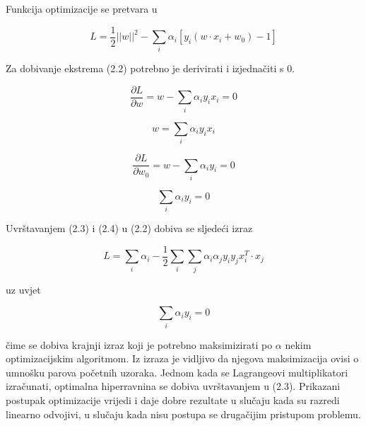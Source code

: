 \documentclass[times, utf8, zavrsni, numeric]{fer}
\begin{document}
Funkcija optimizacije se pretvara u

\begin{equation}
L = \frac{1}{2}\left| \left| w \right| \right|^2 - \sum_i \alpha_i \left[y_i \left(w \cdot x_i + w_0\right) - 1\right]
\end{equation}

Za dobivanje ekstrema (2.2) potrebno je derivirati i izjednačiti s 0.

\[
\frac{\partial L}{\partial w} = w - \sum_i \alpha_i y_i x_i = 0
\]

\begin{equation}
w = \sum_i \alpha_i y_i x_i
\end{equation}

\[
\frac{\partial L}{\partial w_0} = w - \sum_i \alpha_i y_i = 0
\]

\begin{equation}
\sum_i \alpha_i y_i = 0
\end{equation}

\bigbreak

Uvrštavanjem (2.3) i (2.4) u (2.2) dobiva se sljedeći izraz

\begin{equation}
L = \sum_i \alpha_i - \frac{1}{2} \sum_i \sum_j \alpha_i \alpha_j y_i y_j x_i^T \cdot x_j
\end{equation}

uz uvjet

\[
\sum_i \alpha_i y_i = 0
\]

čime se dobiva krajnji izraz koji je potrebno maksimizirati po \(\alpha\) nekim optimizacijskim
algoritmom. Iz izraza je vidljivo da njegova maksimizacija ovisi o umnošku parova početnih uzoraka. 
Jednom kada se Lagrangeovi multiplikatori izračunati, optimalna hiperravnina se dobiva 
uvrštavanjem u (2.3). Prikazani postupak optimizacije vrijedi i daje dobre rezultate u slučaju 
kada su razredi linearno odvojivi, u slučaju kada nisu postupa se drugačijim pristupom problemu.
\end{document}

